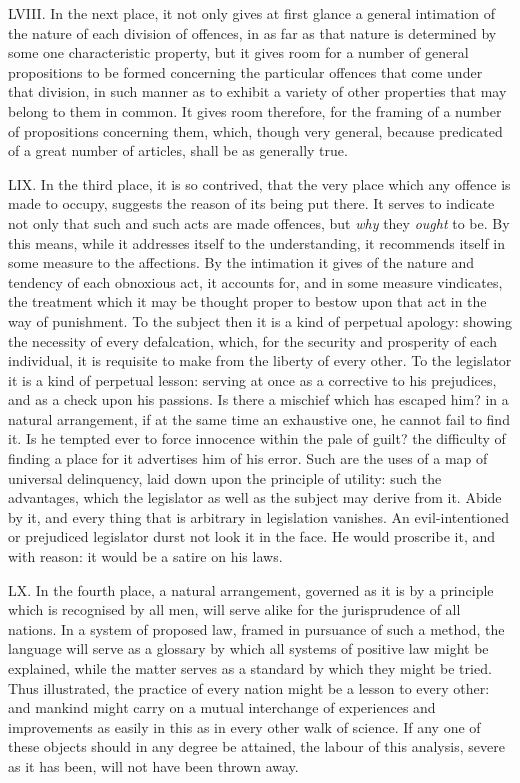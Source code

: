 \documentclass[12pt]{report}
\begin{document}
LVIII. In the next place, it not only gives at first glance a general
intimation of the nature of each division of offences, in as far as that
nature is determined by some one characteristic property, but it gives
room for a number of general propositions to be formed concerning the
particular offences that come under that division, in such manner as to
exhibit a variety of other properties that may belong to them in common.
It gives room therefore, for the framing of a number of propositions
concerning them, which, though very general, because predicated of a
great number of articles, shall be as generally true.

LIX. In the third place, it is so contrived, that the very place which
any offence is made to occupy, suggests the reason of its being put
there. It serves to indicate not only that such and such acts are made
offences, but \emph{why} they \emph{ought} to be. By this means, while
it addresses itself to the understanding, it recommends itself in some
measure to the affections. By the intimation it gives of the nature and
tendency of each obnoxious act, it accounts for, and in some measure
vindicates, the treatment which it may be thought proper to bestow upon
that act in the way of punishment. To the subject then it is a kind of
perpetual apology: showing the necessity of every defalcation, which,
for the security and prosperity of each individual, it is requisite to
make from the liberty of every other. To the legislator it is a kind of
perpetual lesson: serving at once as a corrective to his prejudices, and
as a check upon his passions. Is there a mischief which has escaped him?
in a natural arrangement, if at the same time an exhaustive one, he
cannot fail to find it. Is he tempted ever to force innocence within the
pale of guilt? the difficulty of finding a place for it advertises him
of his error. Such are the uses of a map of universal delinquency, laid
down upon the principle of utility: such the advantages, which the
legislator as well as the subject may derive from it. Abide by it, and
every thing that is arbitrary in legislation vanishes. An
evil-intentioned or prejudiced legislator durst not look it in the face.
He would proscribe it, and with reason: it would be a satire on his
laws.

LX. In the fourth place, a natural arrangement, governed as it is by a
principle which is recognised by all men, will serve alike for the
jurisprudence of all nations. In a system of proposed law, framed in
pursuance of such a method, the language will serve as a glossary by
which all systems of positive law might be explained, while the matter
serves as a standard by which they might be tried. Thus illustrated, the
practice of every nation might be a lesson to every other: and mankind
might carry on a mutual interchange of experiences and improvements as
easily in this as in every other walk of science. If any one of these
objects should in any degree be attained, the labour of this analysis,
severe as it has been, will not have been thrown away.\\
\end{document}
